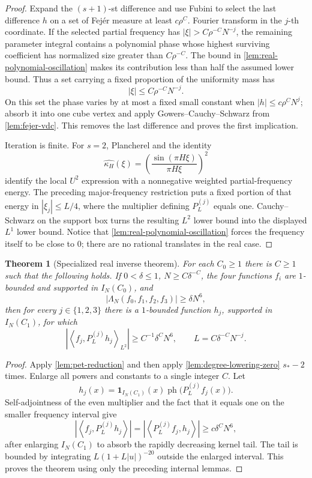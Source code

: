 \documentclass[11pt]{article}
\newtheorem{theorem}{Theorem}[section]
\newcommand{\one}{\mathbf{1}}
\newcommand{\ip}[2]{\left\langle #1,#2\right\rangle}
\newcommand{\abs}[1]{\left|#1\right|}
\newcommand{\indices}{\{1,2,3\}}
\begin{document}
	\begin{proof}
		Expand the \((s+1)\)-st difference and use Fubini to select the last difference \(h\) on a set of Fej\'er measure at least \(c\rho^C\).  Fourier transform in the \(j\)-th coordinate.  If the selected partial frequency has
		\(\abs\xi>C\rho^{-C}N^{-j}\), the remaining parameter integral contains a polynomial phase whose highest surviving coefficient has normalized size greater than \(C\rho^{-C}\).  The bound in \cref{lem:real-polynomial-oscillation} makes its contribution less than half the assumed lower bound.  Thus a set carrying a fixed proportion of the uniformity mass has
		\[
		\abs\xi\leq C\rho^{-C}N^{-j}.
		\]
		On this set the phase varies by at most a fixed small constant when
		\(\abs h\leq c\rho^CN^j\); absorb it into one cube vertex and apply
		Gowers--Cauchy--Schwarz from \cref{lem:fejer-vdc}.  This removes the last difference and proves the first implication.
		
		Iteration is finite.  For \(s=2\), Plancherel and the identity
		\[
		\widehat{\kappa_H}(\xi)
		=
		\left(\frac{\sin(\pi H\xi)}{\pi H\xi}\right)^2
		\]
		identify the local \(U^2\) expression with a nonnegative weighted partial-frequency energy.  The preceding major-frequency restriction puts a fixed portion of that energy in
		\(\abs{\xi_j}\leq L/4\), where the multiplier defining \(P_L^{(j)}\) equals one.  Cauchy--Schwarz on the support box turns the resulting \(L^2\) lower bound into the displayed \(L^1\) lower bound.  Notice that \cref{lem:real-polynomial-oscillation} forces the frequency itself to be close to \(0\); there are no rational translates in the real case.
	\end{proof}
	
	\begin{theorem}[Specialized real inverse theorem]\label{thm:real-inverse}
		For each \(C_0\geq1\) there is \(C\geq1\) such that the following holds.  If \(0<\delta\leq1\),
		\(N\geq C\delta^{-C}\), the four functions \(f_i\) are \(1\)-bounded and supported in \(I_N(C_0)\), and
		\[
		\abs{\Lambda_N(f_0,f_1,f_2,f_3)}\geq\delta N^6,
		\]
		then for every \(j\in\indices\) there is a \(1\)-bounded function \(h_j\), supported in \(I_N(C_1)\), for which
		\[
		\abs{\ip{f_j}{P_L^{(j)}h_j}_{L^2}}
		\geq C^{-1}\delta^CN^6,
		\qquad
		L=C\delta^{-C}N^{-j}.
		\]
	\end{theorem}
	
	\begin{proof}
		Apply \cref{lem:pet-reduction} and then apply
		\cref{lem:degree-lowering-zero} \(s_\ast-2\) times.  Enlarge all powers and constants to a single integer \(C\).  Let
		\[
		h_j(x)=
		\one_{I_N(C_1)}(x)
		\operatorname{ph}\bigl(P_L^{(j)}f_j(x)\bigr).
		\]
		Self-adjointness of the even multiplier and the fact that it equals one on the smaller frequency interval give
		\[
		\abs{\ip{f_j}{P_L^{(j)}h_j}}
		=
		\abs{\ip{P_L^{(j)}f_j}{h_j}}
		\geq
		c\delta^CN^6,
		\]
		after enlarging \(I_N(C_1)\) to absorb the rapidly decreasing kernel tail.  The tail is bounded by integrating
		\(L(1+L\abs u)^{-20}\) outside the enlarged interval.  This proves the theorem using only the preceding internal lemmas.
	\end{proof}
	
\end{document}
